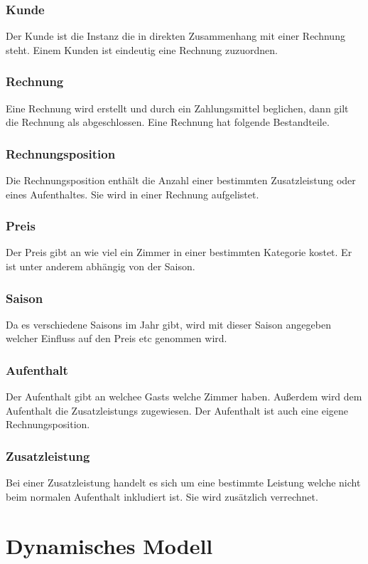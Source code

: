 \documentclass[10pt,a4paper,titlepage]{article}
\begin{document}
\subsubsection{\Gls{Kunde}}
Der \Gls{Kunde} ist die Instanz die in direkten Zusammenhang mit einer Rechnung steht.
Einem \Gls{Kunde}n ist eindeutig eine \Gls{Rechnung} zuzuordnen.
\subsubsection{\Gls{Rechnung}}
Eine \Gls{Rechnung} wird erstellt und durch ein Zahlungsmittel beglichen, dann gilt die \Gls{Rechnung} als abgeschlossen. Eine \Gls{Rechnung} hat folgende Bestandteile.
\subsubsection{Rechnungsposition}
Die Rechnungsposition enthält die Anzahl einer bestimmten \Gls{Zusatzleistung} oder
eines Aufenthaltes. Sie wird in einer \Gls{Rechnung} aufgelistet.
\subsubsection{Preis}
Der Preis gibt an wie viel ein \Gls{Zimmer} in einer bestimmten Kategorie kostet. Er
ist unter anderem abhängig von der \Gls{Saison}.
\subsubsection{\Gls{Saison}}
Da es verschiedene \Glspl{Saison} im Jahr gibt, wird mit dieser \Gls{Saison} angegeben
welcher Einfluss auf den Preis etc genommen wird. 
\subsubsection{\Gls{Aufenthalt}}
Der \Gls{Aufenthalt} gibt an welchee \Glspl{Gast} welche \Gls{Zimmer} haben.
Außerdem wird dem \Gls{Aufenthalt} die \Glspl{Zusatzleistung} zugewiesen. Der \Gls{Aufenthalt} ist auch eine eigene Rechnungsposition.
\subsubsection{\Gls{Zusatzleistung}}
Bei einer \Gls{Zusatzleistung} handelt es sich um eine bestimmte Leistung welche nicht
beim normalen \Gls{Aufenthalt} inkludiert ist. Sie wird zusätzlich verrechnet.

\newpage

\section{Dynamisches Modell}
\end{document}
